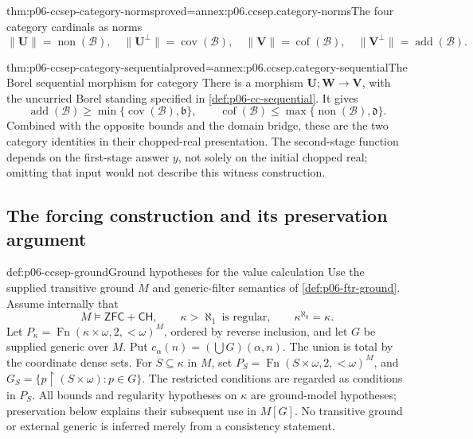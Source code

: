 \begin{hbtheorem}{thm:p06-ccsep-category-norms}{proved=annex:p06.ccsep.category-norms}{The four category cardinals as norms}
\[
 \|\mathbf U\|=\operatorname{non}(\mathcal B),\quad
 \|\mathbf U^\perp\|=\operatorname{cov}(\mathcal B),\quad
 \|\mathbf V\|=\operatorname{cof}(\mathcal B),\quad
 \|\mathbf V^\perp\|=\operatorname{add}(\mathcal B).
\]
\end{hbtheorem}

\begin{hbtheorem}{thm:p06-ccsep-category-sequential}{proved=annex:p06.ccsep.category-sequential}{The Borel sequential morphism for category}
There is a morphism \(\mathbf U;\mathbf W\to\mathbf V\), with the uncurried Borel
standing specified in \cref{def:p06-cc-sequential}. It gives
\[
 \operatorname{add}(\mathcal B)\geq
 \min\{\operatorname{cov}(\mathcal B),\mathfrak b\},\qquad
 \operatorname{cof}(\mathcal B)\leq
 \max\{\operatorname{non}(\mathcal B),\mathfrak d\}.
\]
Combined with the opposite bounds and the domain bridge, these are
the two category identities in their chopped-real presentation.
The second-stage function depends on the first-stage answer \(y\),
not solely on the initial chopped real; omitting that input would
not describe this witness construction.
\end{hbtheorem}

\subsection{The forcing construction and its preservation argument}

\begin{hbconvention}{def:p06-ccsep-ground}{Ground hypotheses for the value calculation}
Use the supplied transitive ground \(M\) and generic-filter semantics
of \cref{def:p06-ftr-ground}. Assume internally that
\[
 M\models\mathsf{ZFC}+\mathsf{CH},\qquad
 \kappa>\aleph_1\ \text{is regular},\qquad
 \kappa^{\aleph_0}=\kappa.
\]
Let
\(P_\kappa=\operatorname{Fn}(\kappa\times\omega,2,{<}\omega)^M\),
ordered by reverse inclusion, and let \(G\) be supplied generic over
\(M\). Put \(c_\alpha(n)=(\bigcup G)(\alpha,n)\).
The union is total by the coordinate dense sets.
For \(S\subseteq\kappa\) in \(M\), set
\(P_S=\operatorname{Fn}(S\times\omega,2,{<}\omega)^M\), and
\(G_S=\{p\mathbin{\upharpoonright}(S\times\omega):p\in G\}\).
The restricted conditions are regarded as conditions in \(P_S\).
All bounds and regularity hypotheses on \(\kappa\) are ground-model
hypotheses; preservation below explains their subsequent use in \(M[G]\).
No transitive ground or external generic is inferred merely from a
consistency statement.
\end{hbconvention}

